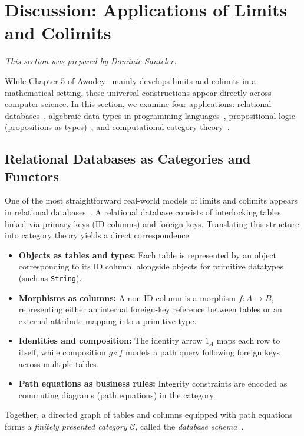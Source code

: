 \section{Discussion: Applications of Limits and Colimits}
\label{sec:discussion}

\emph{This section was prepared by Dominic Santeler.}

While Chapter 5 of Awodey~\cite{Awodey10} mainly develops limits and colimits in a mathematical setting, these universal constructions appear directly across computer
science. In this section, we examine four applications: relational databases~\cite{FongSpivak19}, algebraic data types in programming languages~\cite{Milewski18}, propositional logic (propositions as types)~\cite{Awodey10,Milewski18}, and computational category theory~\cite{RydeheardBurstall88}.

\subsection{Relational Databases as Categories and Functors}
\label{sec:db-schemas}

One of the most straightforward real-world models of limits and colimits appears in relational databases~\cite[Ch.~3]{FongSpivak19}. A relational database consists of interlocking tables linked via primary keys (ID columns) and foreign keys. Translating this structure into category theory yields a direct correspondence:
\begin{itemize}
  \item \textbf{Objects as tables and types:} Each table is represented by an object corresponding to its ID column, alongside objects for primitive datatypes (such as \texttt{String}).
  \item \textbf{Morphisms as columns:} A non-ID column is a morphism $f \colon A \to B$, representing either an internal foreign-key reference between tables or an external attribute mapping into a primitive type.
  \item \textbf{Identities and composition:} The identity arrow $1_A$ maps each row to itself, while composition $g \circ f$ models a path query following foreign keys across multiple tables.
  \item \textbf{Path equations as business rules:} Integrity constraints are encoded as commuting diagrams (path equations) in the category.
\end{itemize}
Together, a directed graph of tables and columns equipped with path equations forms a \emph{finitely presented category} $\mathcal{C}$, called the \emph{database schema}~\cite[Sec.~3.1--3.2]{FongSpivak19}.

